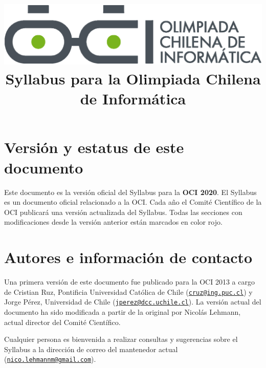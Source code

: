 \documentclass{article}
\newcommand{\new}{\color{red}}
\begin{document}
\title{
    \includegraphics[scale=0.2]{OCIlogo.eps}\\
    \vskip 20pt
    Syllabus para la Olimpiada Chilena de Informática}
\date{}
\maketitle

\section{Versión y estatus de este documento}
Este documento es la versión oficial del Syllabus para la \textbf{OCI 2020}.
El Syllabus es un documento oficial relacionado a la OCI.
Cada año el Comité Científico de la OCI publicará una versión actualizada del Syllabus.
{\new
  Todas las secciones con modificaciones desde la versión anterior están marcados en color rojo.
}

\section{Autores e información de contacto}
Una primera versión de este documento fue publicado para la OCI 2013 a cargo de
Cristian Ruz, Pontificia Universidad Católica de Chile (\href{mailto:cruz@ing.puc.cl}{\nolinkurl{cruz@ing.puc.cl}}) y
Jorge Pérez, Universidad de Chile (\href{mailto:jperez@dcc.uchile.cl}{\nolinkurl{jperez@dcc.uchile.cl}}).
La versión actual del documento ha sido modificada a partir de la original por Nicolás Lehmann, actual director del Comité Científico.

Cualquier persona es bienvenida a realizar consultas y sugerencias sobre el
Syllabus a la dirección de correo del mantenedor actual (\href{mailto:nico.lehmannm@gmail.com}{\nolinkurl{nico.lehmannm@gmail.com}}).
\end{document}
